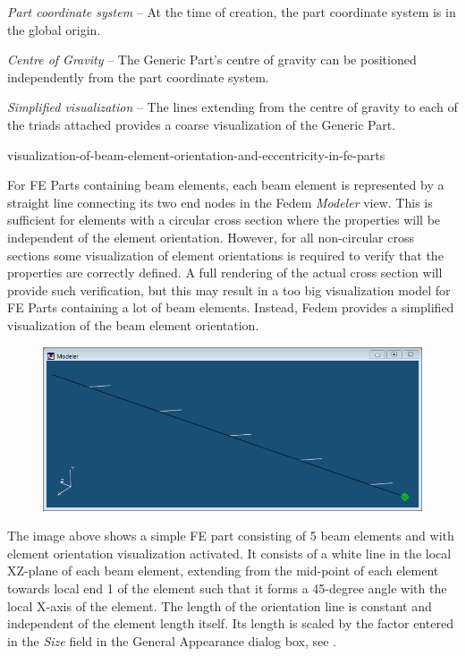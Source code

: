 \begin{bulletlist}
\item{\sl Part coordinate system} --
  At the time of creation, the part coordinate system is in the global origin.
\item{\sl Centre of Gravity} --
  The Generic Part's centre of gravity can be positioned independently
  from the part coordinate system.
\item{\sl Simplified visualization} --
  The lines extending from the centre of gravity to each of the triads attached
  provides a coarse visualization of the Generic Part.
\end{bulletlist}


           {visualization-of-beam-element-orientation-and-eccentricity-in-fe-parts}


For FE Parts containing beam elements, each beam element is represented
by a straight line connecting its two end nodes in the Fedem
{\sl Modeler} view. This is sufficient for elements with a circular cross
section where the properties will be independent of the element orientation.
However, for all non-circular cross sections some visualization of element
orientations is required to verify that the properties are correctly defined.
A full rendering of the actual cross section will provide such verification,
but this may result in a too big visualization model for FE Parts containing
a lot of beam elements. Instead,
Fedem provides a simplified visualization of the beam element orientation.

\begin{figure}[H]
  \includegraphics[width=\textwidth]{Figures/4-FEBeamOrient}
\end{figure}

The image above shows a simple FE part consisting of 5 beam elements and with
element orientation visualization activated.
It consists of a white line in the local XZ-plane of each beam element,
extending from the mid-point of each element towards local end 1 of the element
such that it forms a 45-degree angle with the local X-axis of the element.
The length of the orientation line is constant and independent of the element
length itself. Its length is scaled by the factor entered in the {\sl Size}
field in the General Appearance dialog box,
see .

